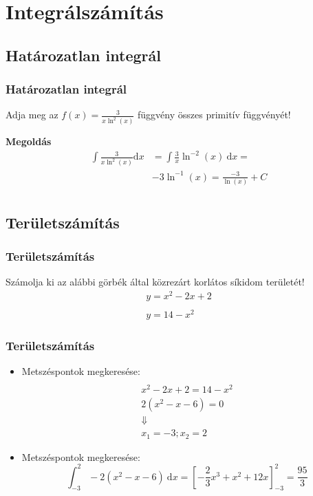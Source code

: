 \documentclass[ignorenonframetext]{beamer}
\begin{document}
\section{Integrálszámítás}
\subsection{Határozatlan integrál}
\begin{frame}[fragile]
\frametitle{Határozatlan integrál}
\begin{center}
    Adja meg az $f(x)=\displaystyle\frac{3}{x\ln^2(x)}$ függvény összes primitív függvényét!
\end{center}
\textbf{Megoldás}
\begin{align*}
    \int\frac{3}{x\ln^2(x)}\mathrm{d}x &= \int\frac{3}{x}\ln^{-2}(x)\ \mathrm{d}x=\\
    &-3\ln^{-1}(x)=\frac{-3}{\ln(x)}+C\\
\end{align*}
\end{frame}
\subsection{Területszámítás}
\begin{frame}[fragile]
\frametitle{Területszámítás}
Számolja ki az alábbi görbék által közrezárt korlátos síkidom területét!
\begin{gather*}
        y=x^2-2x+2 \\
        \\
        y=14-x^2
    \end{gather*}
\end{frame}

\begin{frame}[fragile]
\frametitle{Területszámítás}
\begin{itemize}
    \item Metszéspontok megkeresése:
    \begin{gather*}
        \\
        x^2-2x+2=14-x^2\\
        2(x^2-x-6)=0\\
        \Downarrow\\
        x_1=-3;x_2=2
    \end{gather*}
    \item Metszéspontok megkeresése:
    \[
        \displaystyle\int_{-3}^{2}
        -2(x^2-x-6)\ \mathrm{d}x=\left[-\frac{2}{3}x^3+x^2+12x\right]^2_{-3}=\frac{95}{3}
    \]
\end{itemize}
\end{frame}
\end{document}
